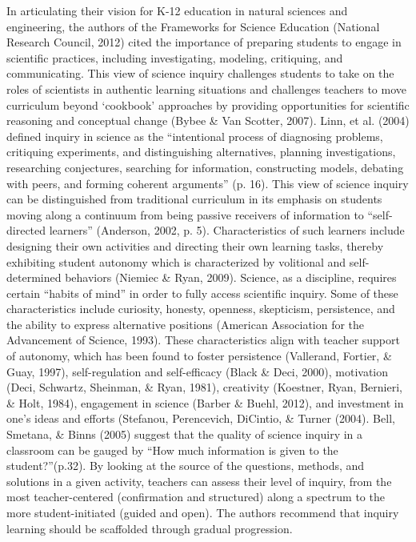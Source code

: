 \documentclass[11.5pt]{sig-alternate} %
\begin{document}
\begin{large}
In articulating their vision for K-12 education in natural sciences and engineering, the authors of the Frameworks for Science Education (National Research Council, 2012) cited the importance of preparing students to engage in scientific practices, including investigating, modeling, critiquing, and communicating.  This  view of science inquiry challenges students to take on the roles of scientists in authentic learning situations and challenges teachers to move curriculum beyond ‘cookbook’ approaches by providing opportunities for scientific reasoning and conceptual change (Bybee \& Van Scotter, 2007).  Linn, et al. (2004) defined inquiry in science as the “intentional process of diagnosing problems, critiquing experiments, and distinguishing alternatives, planning investigations, researching conjectures, searching for information, constructing models, debating with peers, and forming coherent arguments” (p. 16). This view of science inquiry can be distinguished from traditional curriculum in its emphasis on students moving along a continuum from being passive receivers of information to “self-directed learners” (Anderson, 2002, p. 5). Characteristics of such learners include designing their own activities and directing their own learning tasks, thereby exhibiting student autonomy which is characterized by volitional and self-determined behaviors (Niemiec \& Ryan, 2009). Science, as a discipline, requires certain “habits of mind” in order to fully access scientific inquiry.  Some of these characteristics include curiosity, honesty, openness, skepticism, persistence, and the ability to express alternative positions (American Association for the Advancement of Science, 1993). These characteristics align with teacher support of autonomy, which has been found to foster persistence (Vallerand, Fortier, \& Guay, 1997), self-regulation and self-efficacy (Black \& Deci, 2000),  motivation (Deci, Schwartz, Sheinman, \& Ryan, 1981), creativity (Koestner, Ryan, Bernieri, \& Holt, 1984), engagement in science (Barber \& Buehl, 2012), and investment in one’s ideas and efforts (Stefanou, Perencevich, DiCintio, \& Turner (2004). Bell, Smetana, \& Binns (2005) suggest that the quality of science inquiry in a classroom can be gauged by “How much information is given to the student?”(p.32). By looking at the source of the questions, methods, and solutions in a given activity, teachers can assess their level of inquiry, from the most teacher-centered (confirmation and structured) along a spectrum to the more student-initiated (guided and open).  The authors recommend that inquiry learning should be scaffolded through gradual progression. 


\end{large}
\end{document}
